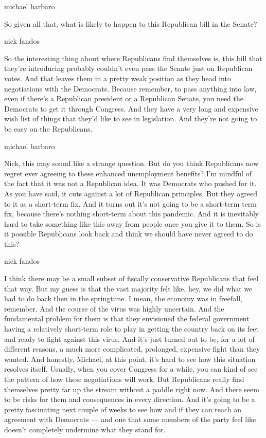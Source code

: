 michael barbaro

So given all that, what is likely to happen to this Republican bill in
the Senate?

nick fandos

So the interesting thing about where Republicans find themselves is,
this bill that they're introducing probably couldn't even pass the
Senate just on Republican votes. And that leaves them in a pretty weak
position as they head into negotiations with the Democrats. Because
remember, to pass anything into law, even if there's a Republican
president or a Republican Senate, you need the Democrats to get it
through Congress. And they have a very long and expensive wish list of
things that they'd like to see in legislation. And they're not going to
be easy on the Republicans.

michael barbaro

Nick, this may sound like a strange question. But do you think
Republicans now regret ever agreeing to these enhanced unemployment
benefits? I'm mindful of the fact that it was not a Republican idea. It
was Democrats who pushed for it. As you have said, it cuts against a lot
of Republican principles. But they agreed to it as a short-term fix. And
it turns out it's not going to be a short-term term fix, because there's
nothing short-term about this pandemic. And it is inevitably hard to
take something like this away from people once you give it to them. So
is it possible Republicans look back and think we should have never
agreed to do this?

nick fandos

I think there may be a small subset of fiscally conservative Republicans
that feel that way. But my guess is that the vast majority felt like,
hey, we did what we had to do back then in the springtime. I mean, the
economy was in freefall, remember. And the course of the virus was
highly uncertain. And the fundamental problem for them is that they
envisioned the federal government having a relatively short-term role to
play in getting the country back on its feet and ready to fight against
this virus. And it's just turned out to be, for a lot of different
reasons, a much more complicated, prolonged, expensive fight than they
wanted. And honestly, Michael, at this point, it's hard to see how this
situation resolves itself. Usually, when you cover Congress for a while,
you can kind of see the pattern of how these negotiations will work. But
Republicans really find themselves pretty far up the stream without a
paddle right now. And there seem to be risks for them and consequences
in every direction. And it's going to be a pretty fascinating next
couple of weeks to see how and if they can reach an agreement with
Democrats --- and one that some members of the party feel like doesn't
completely undermine what they stand for.

